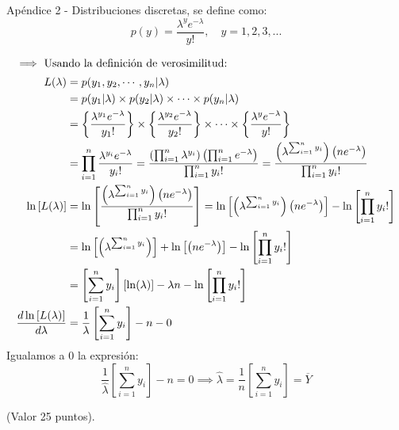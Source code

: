 \begin{enumerate}
\begin{solution}
		\begin{tcolorbox}[colback=gray!15,colframe=black!1!black,title=Función de probabilidad de Poisson]
			Apéndice 2 - Distribuciones discretas, se define como: 
			$$p(y)=\frac{\lambda^ye^{-\lambda}}{y!}, \quad y=1,2,3,...$$
		\end{tcolorbox}
	\begin{align*}
		\intertext{$\implies$ Usando la definición de verosimilitud:}
		L(\lambda) &= p(y_1,y_2,\cdots, y_n | \lambda ) \\
								&= p(y_1|\lambda)\times  p(y_2|\lambda) \times \cdots  \times p(y_n|\lambda)\\
								&= \left\{\frac{\lambda^{y_1}e^{-\lambda}}{y_1!}\right\}\times \left\{\frac{\lambda^{y_2}e^{-\lambda}}{y_2!}\right\}\times \cdots \times \left\{\frac{\lambda^{y}e^{-\lambda}}{y!}\right\}\\
								&= \prod_{i=1}^{n}\frac{\lambda^{y_i}e^{-\lambda}}{y_i!}=\frac{\left(\prod_{i=1}^{n}\lambda^{y_i}\right)\left(\prod_{i=1}^{n}e^{-\lambda}\right)}{\prod_{i=1}^{n}y_i!}=\frac{\left(\lambda^{\sum_{i=1}^{n}y_i}\right)\left(ne^{-\lambda}\right)}{\prod_{i=1}^{n}y_i!}\\
		\ln\left[L(\lambda) \right]&=\ln \left[\frac{\left(\lambda^{\sum_{i=1}^{n}y_i}\right)\left(ne^{-\lambda}\right)}{\prod_{i=1}^{n}y_i!}\right]=\ln\left[\left(\lambda^{\sum_{i=1}^{n}y_i}\right)\left(ne^{-\lambda}\right)\right]-\ln\left[\prod_{i=1}^{n}y_i!\right]\\
		&=\ln\left[\left(\lambda^{\sum_{i=1}^{n}y_i}\right)\right]+\ln\left[\left(ne^{-\lambda}\right)\right]-\ln\left[\prod_{i=1}^{n}y_i!\right]\\
		&=\left[\sum_{i=1}^{n}y_i\right]\left[\ln(\lambda)\right]-\lambda n -\ln\left[\prod_{i=1}^{n}y_i!\right]\\
		\frac{d	\ln\left[L(\lambda) \right] }{d\lambda}&=\frac{1}{\lambda}\left[\sum_{i=1}^{n}y_i\right]-n-0
			\end{align*}
		Igualamos a 0 la expresión:
		$$\frac{1}{\hat{\lambda}}\left[\sum_{i=1}^{n}y_i\right]-n = 0\implies \hat{\lambda}=\frac{1}{n}\left[\sum_{i=1}^{n}y_i\right]=\overline{Y}$$
	\end{solution}
\end{enumerate}

(Valor 25 puntos).